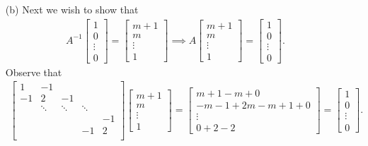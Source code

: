 \documentclass[12pt]{report}
\begin{document}
\begin{solution}
\begin{enumerate}
      \item [(b)]
      Next we wish to show that
      \begin{align*}\label{unit} A^{-1} \begin{bmatrix}  1 \\ 0 \\ \vdots \\ 0 \end{bmatrix} = \begin{bmatrix}  m +1 \\ m \\ \vdots \\ 1 \end{bmatrix} \implies A \begin{bmatrix}  m +1 \\ m \\ \vdots \\ 1 \end{bmatrix} = \begin{bmatrix}  1 \\ 0 \\ \vdots \\ 0 \end{bmatrix}.\end{align*}
      Observe that 
      \begin{align*}
        \begin{bmatrix} 1 & -1 \\ -1 & 2 &-1 \\
          & \ddots & \ddots & \ddots \\
          &&&& -1\\
          &&&-1& 2\\
        \end{bmatrix}\begin{bmatrix}  m +1 \\ m \\ \vdots \\ 1 \end{bmatrix}  = \begin{bmatrix}
          m + 1 - m + 0\\
          - m - 1 + 2m - m + 1 + 0\\
          \vdots\\
          0 + 2 - 2
        \end{bmatrix} = \begin{bmatrix}
          1\\ 0 \\ \vdots \\ 0
        \end{bmatrix}.
      \end{align*}


\end{enumerate}
\end{solution}
\end{document}
